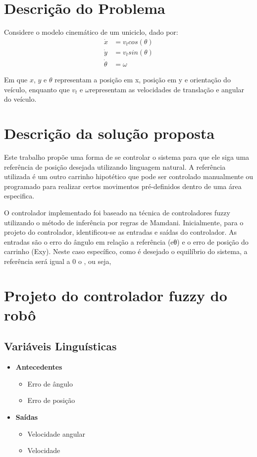 \graphicspath{ {./imagens/} }

\section{Descrição do Problema}
Considere o modelo cinemático de um uniciclo, dado por:
    \begin{align*}
            \dot{x} &= v_t cos(\theta)\\
            \dot{y} &= v_t sin(\theta)\\
            \dot{\theta} &= \omega
    \end{align*}

Em que $x$, $y$ e $\theta$ representam a posição em x, posição em y e orientação do veículo, enquanto
que $v_t$ e $\omega$representam as velocidades de translação e angular do veículo.

\section{Descrição da solução proposta}

Este trabalho propõe uma forma de se controlar o sistema para que ele siga uma referência de posição desejada utilizando linguagem natural. A referência utilizada é um outro carrinho hipotético que pode ser controlado manualmente ou programado para realizar certos movimentos pré-definidos dentro de uma área especifica.

O controlador implementado foi baseado na técnica de controladores fuzzy utilizando
o método de inferência por regras de Mamdani. 
Inicialmente, para o projeto do controlador, identificou-se as entradas e saídas do controlador. As entradas são o erro do ângulo em relação a referência (eθ) e o erro de posição do carrinho (Exy). Neste caso específico, como é desejado o equilíbrio do sistema, a
referência será igual a 0
o
, ou seja,

\section{Projeto do controlador fuzzy do robô}
    \subsection{Variáveis Linguísticas}
        \begin{itemize}
            \item{\bf{Antecedentes}}
                \begin{itemize}
                    \item Erro de ângulo
                    \item Erro de posição
                \end{itemize}
            \item{\bf{Saídas}}
                \begin{itemize}
                        \item Velocidade angular
                        \item Velocidade
                \end{itemize}
        \end{itemize}
